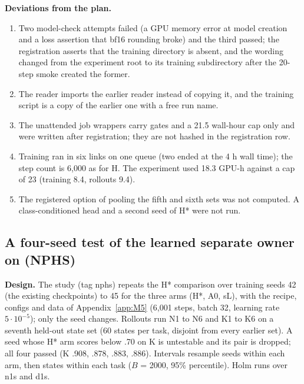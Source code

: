 \textbf{Deviations from the plan.}
\begin{enumerate}
\item Two model-check attempts failed (a GPU memory error at model creation and a loss assertion that bf16 rounding broke) and the third passed; the registration asserts that the training directory is absent, and the wording changed from the experiment root to its training subdirectory after the 20-step smoke created the former.
\item The reader imports the earlier reader instead of copying it, and the training script is a copy of the earlier one with a free run name.
\item The unattended job wrappers carry gates and a 21.5 wall-hour cap only and were written after registration; they are not hashed in the registration row.
\item Training ran in six links on one queue (two ended at the 4 h wall time); the step count is 6,000 as for H. The experiment used 18.3 GPU-h against a cap of 23 (training 8.4, rollouts 9.4).
\item The registered option of pooling the fifth and sixth sets was not computed. A class-conditioned head and a second seed of H* were not run.
\end{enumerate}

\subsection{A four-seed test of the learned separate owner on \pizero{} (NPHS)}
\label{app:M6}

\textbf{Design.} The study (tag nphs) repeats the H* comparison over training seeds 42 (the existing checkpoints) to 45 for the three \pizero{} arms (H*, A0, sL), with the recipe, configs and data of Appendix~\ref{app:M5} (6,001 steps, batch 32, learning rate $5\cdot10^{-5}$); only the seed changes. Rollouts run N1 to N6 and K1 to K6 on a seventh held-out state set (60 states per task, disjoint from every earlier set). A seed whose H* arm scores below .70 on K is untestable and its pair is dropped; all four passed (K .908, .878, .883, .886). Intervals resample seeds within each arm, then states within each task ($B$ = 2000, 95\% percentile). Holm runs over n1s and d1s.

